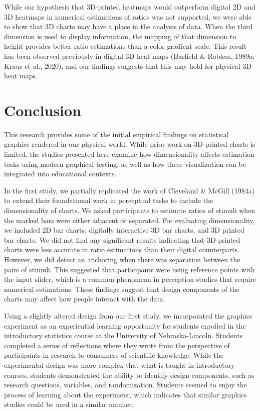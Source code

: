 \documentclass[phd]{nuthesis}
\begin{document}
While our hypothesis that 3D-printed heatmaps would outperform digital
2D and 3D heatmaps in numerical estimations of ratios was not supported,
we were able to show that 3D charts may have a place in the analysis of
data. When the third dimension is used to display information, the
mapping of that dimension to height provides better ratio estimations
than a color gradient scale. This result has been observed previously in
digital 3D heat maps (Barfield \& Robless, 1989a; Kraus et al., 2020),
and our findings suggests that this may hold for physical 3D heat maps.


\chapter{Conclusion}\label{conclusion}

This research provides some of the initial empirical findings on
statistical graphics rendered in our physical world. While prior work on
3D-printed charts is limited, the studies presented here examine how
dimensionality affects estimation tasks using modern graphical testing,
as well as how these visualization can be integrated into educational
contexts.

In the first study, we partially replicated the work of Cleveland \&
McGill (1984a) to extend their foundational work in perceptual tasks to
include the dimensionality of charts. We asked participants to estimate
ratios of stimuli when the marked bars were either adjacent or
separated. For evaluating dimensionality, we included 2D bar charts,
digitally interactive 3D bar charts, and 3D printed bar charts. We did
not find any significant results indicating that 3D-printed charts were
less accurate in ratio estimations than their digital counterparts.
However, we did detect an anchoring when there was separation between
the pairs of stimuli. This suggested that participants were using
reference points with the input slider, which is a common phenomena in
perception studies that require numerical estimations. These findings
suggest that design components of the charts may affect how people
interact with the data.

Using a slightly altered design from our first study, we incorporated
the graphics experiment as an experiential learning opportunity for
students enrolled in the introductory statistics course at the
University of Nebraska-Lincoln. Students completed a series of
reflections where they wrote from the perspective of participants in
research to consumers of scientific knowledge. While the experimental
design was more complex that what is taught in introductory courses,
students demonstrated the ability to identify design components, such as
research questions, variables, and randomization. Students seemed to
enjoy the process of learning about the experiment, which indicates that
similar graphics studies could be used in a similar manner.
\end{document}
